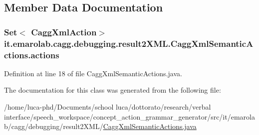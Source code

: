 \subsection{Member Data Documentation}
\hypertarget{classit_1_1emarolab_1_1cagg_1_1debugging_1_1result2XML_1_1CaggXmlSemanticActions_a49c67afb5ef8bc2a354aa61b80b25a42}{
\subsubsection[{actions}]{\setlength{\rightskip}{0pt plus 5cm}Set$<$ {\bf Cagg\-Xml\-Action}$>$ it.\-emarolab.\-cagg.\-debugging.\-result2\-X\-M\-L.\-Cagg\-Xml\-Semantic\-Actions.\-actions\hspace{0.3cm}{\ttfamily [private]}}}\label{classit_1_1emarolab_1_1cagg_1_1debugging_1_1result2XML_1_1CaggXmlSemanticActions_a49c67afb5ef8bc2a354aa61b80b25a42}


Definition at line 18 of file Cagg\-Xml\-Semantic\-Actions.\-java.



The documentation for this class was generated from the following file\-:\begin{DoxyCompactItemize}
\item 
/home/luca-\/phd/\-Documents/school luca/dottorato/research/verbal interface/speech\-\_\-workspace/concept\-\_\-action\-\_\-grammar\-\_\-generator/src/it/emarolab/cagg/debugging/result2\-X\-M\-L/\hyperlink{CaggXmlSemanticActions_8java}{Cagg\-Xml\-Semantic\-Actions.\-java}\end{DoxyCompactItemize}
